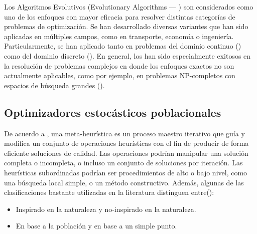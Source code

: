 
Los Algoritmos Evolutivos (Evolutionary Algorithms --- \EAS{}) son considerados como uno de los enfoques con mayor 
eficacia para resolver distintas categorías de problemas de optimización.
%
Se han desarrollado diversas variantes que han sido aplicadas en múltiples campos, como en transporte, economía o ingeniería.
%
Particularmente, se han aplicado tanto en problemas del dominio continuo (\cite{glover2005handbook}) como del 
dominio discreto (\cite{Joel:Dynamic_FAP}).
%
En general, los \EAS{} han sido especialmente exitosos en la resolución de problemas complejos en donde los enfoques exactos 
no son actualmente aplicables, como por ejemplo, en problemas NP-completos con espacios de búsqueda 
grandes (\cite{chakraborty2008advances}).
% 
\subsection{Optimizadores estocásticos poblacionales}

De acuerdo a \cite{voss2012meta}, una meta-heurística es un proceso maestro iterativo que guía y modifica un conjunto de operaciones 
heurísticas con el fin de producir de forma eficiente soluciones de calidad. 
%
Las operaciones podrían manipular una solución completa o incompleta, o incluso un conjunto de soluciones por iteración.
%
Las heurísticas subordinadas podrían ser procedimientos de alto o bajo nivel, como una búsqueda local simple, o un método 
constructivo.
%
Además, algunas de las clasificaciones bastante utilizadas en la literatura distinguen entre(\cite{beheshti2013review}):
\begin{itemize}
    \item Inspirado en la naturaleza y no-inspirado en la naturaleza.
    \item En base a la población y en base a un simple punto.
\end{itemize}

